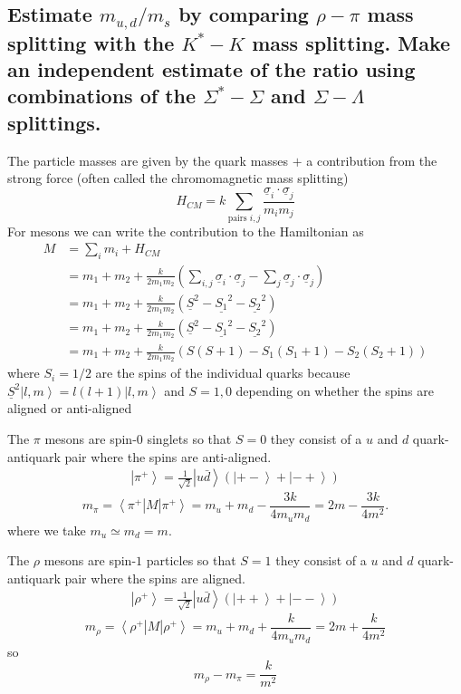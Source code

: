 \documentclass[main.tex]{subfiles}
\begin{document}
\subsection{}
\subsection{Estimate $m_{u,d}/m_s$ by comparing $\rho-\pi$ mass splitting with the $K^*-K$ mass splitting. Make an independent estimate of the ratio using combinations of the $\Sigma^*-\Sigma$ and $\Sigma-\Lambda$ splittings.}
The particle masses are given by the quark masses $+$ a contribution from the strong force (often called the chromomagnetic mass splitting)
\begin{equation}
H_{CM}=k\sum_{\text{pairs } i,j}\frac{\underline{\sigma}_i\cdot\underline{\sigma}_j}{m_im_j}
\end{equation}
For mesons we can write the contribution to the Hamiltonian as
\begin{align}\label{eq:17hamil}
M&=\sum_im_i+ H_{CM}\\
&=m_1+m_2+\frac{k}{2m_1m_2}\left(\sum_{i,j}\underline{\sigma}_i\cdot\underline{\sigma}_j-\sum_j\underline{\sigma}_j\cdot\underline{\sigma}_j\right)\\
&=m_1+m_2+\frac{k}{2m_1m_2}\left(\underline{S}^2-\underline{S_1}^2-\underline{S_2}^2\right)\\
&=m_1+m_2+\frac{k}{2m_1m_2}\left(\underline{S}^2-\underline{S_1}^2-\underline{S_2}^2\right)\\
&=m_1+m_2+\frac{k}{2m_1m_2}\left(S(S+1)-S_1(S_1+1)-S_2(S_2+1)\right)
\end{align}
where $S_i=1/2$ are the spins of the individual quarks because $\underline{S}^2\left|l,m\right>=l(l+1)\left|l,m\right>$ and $S=1,0$ depending on whether the spins are aligned or anti-aligned

The $\pi$ mesons are spin-$0$ singlets so that $S=0$ they consist of a $u$ and $d$ quark-antiquark pair where the spins are anti-aligned.
\begin{align}
\left|\pi^+\right>=\frac{1}{\sqrt{2}}\left|u\bar{d}\right>(\left|+-\right>+\left|-+\right>)
\end{align}
\begin{equation}
m_{\pi}=\left<\pi^+\right|M\left|\pi^+\right>=m_u+m_d-\frac{3k}{4m_um_d}=2m-\frac{3k}{4m^2}.
\end{equation}
where we take $m_u\simeq m_d=m$.

The $\rho$ mesons are spin-$1$ particles so that $S=1$ they consist of a $u$ and $d$ quark-antiquark pair where the spins are aligned.
\begin{align}
\left|\rho^+\right>=\frac{1}{\sqrt{2}}\left|u\bar{d}\right>(\left|++\right>+\left|--\right>)
\end{align}
\begin{equation}
m_{\rho}=\left<\rho^+\right|M\left|\rho^+\right>=m_u+m_d+\frac{k}{4m_um_d}=2m+\frac{k}{4m^2}
\end{equation}
so 
\begin{equation}
m_{\rho}-m_{\pi}=\frac{k}{m^2}
\end{equation}
\end{document}
